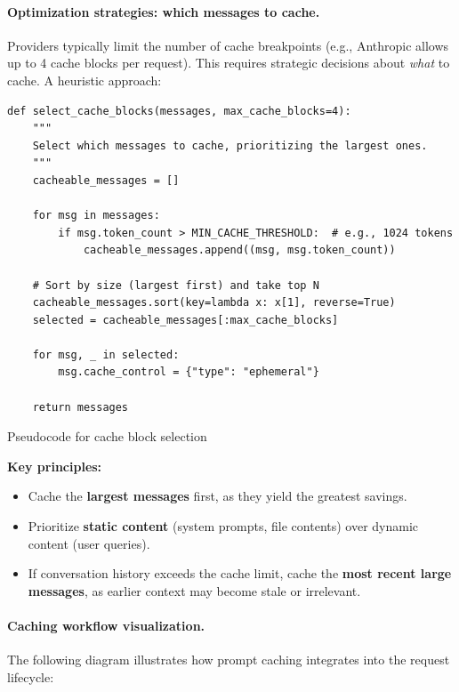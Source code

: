 \documentclass[english]{article}
\begin{document}
\paragraph{Optimization strategies: which messages to cache.}

Providers typically limit the number of cache breakpoints (e.g., Anthropic allows up to 4 cache blocks per request). This requires strategic decisions about \emph{what} to cache. A heuristic approach:

\begin{listing}[H]
\begin{verbatim}
def select_cache_blocks(messages, max_cache_blocks=4):
    """
    Select which messages to cache, prioritizing the largest ones.
    """
    cacheable_messages = []

    for msg in messages:
        if msg.token_count > MIN_CACHE_THRESHOLD:  # e.g., 1024 tokens
            cacheable_messages.append((msg, msg.token_count))

    # Sort by size (largest first) and take top N
    cacheable_messages.sort(key=lambda x: x[1], reverse=True)
    selected = cacheable_messages[:max_cache_blocks]

    for msg, _ in selected:
        msg.cache_control = {"type": "ephemeral"}

    return messages
\end{verbatim}
\caption{Pseudocode for cache block selection}
\end{listing}

\textbf{Key principles:}
\begin{itemize}
    \item Cache the \textbf{largest messages} first, as they yield the greatest savings.
    \item Prioritize \textbf{static content} (system prompts, file contents) over dynamic content (user queries).
    \item If conversation history exceeds the cache limit, cache the \textbf{most recent large messages}, as earlier context may become stale or irrelevant.
\end{itemize}

\paragraph{Caching workflow visualization.}

The following diagram illustrates how prompt caching integrates into the request lifecycle:
\end{document}
